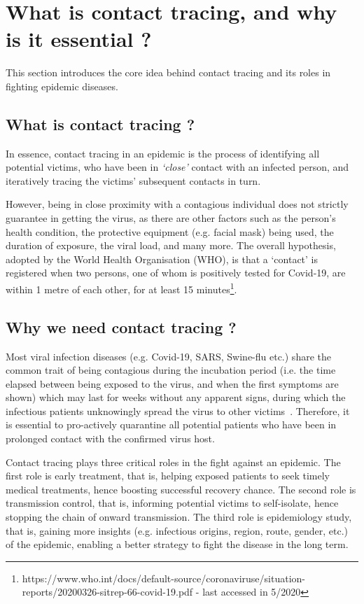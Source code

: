 \documentclass[graybox]{svmult}
\begin{document}
\section{What is contact tracing, and why is it essential ?}
This section introduces the core idea behind contact tracing and its roles in fighting epidemic diseases.

\subsection{What is contact tracing ?}
In essence, contact tracing in an epidemic is the process of identifying all potential victims, who have been in \textit{`close'} contact with an infected person, and iteratively tracing the victims' subsequent contacts in turn.

However, being in close proximity with a contagious individual does not strictly guarantee in getting the virus, as there are other factors such as the person's health condition, the protective equipment (e.g. facial mask) being used, the duration of exposure, the viral load, and many more. The overall hypothesis, adopted by the World Health Organisation (WHO), is that a `contact' is registered when two persons, one of whom is positively tested for Covid-19, are within 1 metre of each other, for at least 15 minutes\footnote{https://www.who.int/docs/default-source/coronaviruse/situation-reports/20200326-sitrep-66-covid-19.pdf - last accessed in 5/2020}.


\subsection{Why we need contact tracing ?}
Most viral infection diseases (e.g. Covid-19, SARS, Swine-flu etc.) share the common trait of being contagious during the incubation period (i.e. the time elapsed between being exposed to the virus, and when the first symptoms are shown) which may last for weeks without any apparent signs, during which the infectious patients unknowingly spread the virus to other victims~\cite{jiang2020does,leung2020difference}. Therefore, it is essential to pro-actively quarantine all potential patients who have been in prolonged contact with the confirmed virus host.

Contact tracing plays three critical roles in the fight against an epidemic. The first role is early treatment, that is, helping exposed patients to seek timely medical treatments, hence boosting successful recovery chance. The second role is transmission control, that is, informing potential victims to self-isolate, hence stopping the chain of onward transmission. The third role is epidemiology study, that is, gaining more insights (e.g. infectious origins, region, route, gender, etc.) of the epidemic, enabling a better strategy to fight the disease in the long term.
\end{document}
